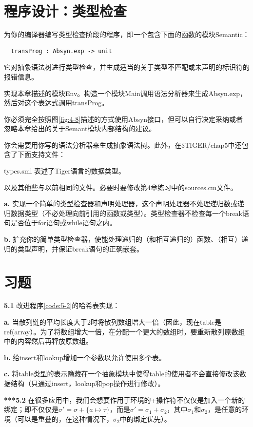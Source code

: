 \documentclass[cn,11pt,chinese]{elegantbook}
\begin{document}
\section{程序设计：类型检查}

为你的编译器编写类型检查阶段的程序，即一个包含下面的函数的模块Semantic：

\begin{lstlisting}
  transProg : Absyn.exp -> unit
\end{lstlisting}

它对抽象语法树进行类型检查，并生成适当的关于类型不匹配或未声明的标识符的报错信息。

实现本章描述的模块Env。构造一个模块Main调用语法分析器来生成Absyn.exp，然后对这个表达式调用transProg。

你必须完全按照图\ref{fig:4-8}描述的方式使用Absyn接口，但可以自行决定采纳或者忽略本章给出的关于Semant模块内部结构的建议。

你会需要用你写的语法分析器来生成抽象语法树。此外，在\$TIGER/chap5中还包含了下面支持文件：

types.sml 表述了Tiger语言的数据类型。

以及其他些与以前相同的文件。必要时要修改第4章练习中的sources.cm文件。

\textbf{a.} 实现一个简单的类型检查器和声明处理器，这个声明处理器不处理递归数或递归数据类型（不必处理向前引用的函数或类型）。类型检查器不检查每一个break语句是否位于for语句或while语句之内。

\textbf{b.} 扩充你的简单类型检查器，使能处理递归的（和相互递归的）函数、（相互）递归的类型声明，并保证break语句的正确嵌套。

\section{习题}

\textbf{5.1} 改进程序\ref{code:5-2}的哈希表实现：

\textbf{a.} 当散列链的平均长度大于2时将散列数组增大一倍（因此，现在table是ref(array）。为了将数组增大一倍，在分配一个更大的数组时，要重新散列原数组中的内容然后再释放原数组。

\textbf{b.} 给insert和lookup增加一个参数以允许使用多个表。

\textbf{c.} 将table类型的表示隐藏在一个抽象模块中使得table的使用者不会直接修改该数据结构（只通过insert，lookup和pop操作进行修改）。

\textbf{***5.2} 在很多应用中，我们会想要作用于环境的+操作符不仅仅是加入一个新的绑定；即不仅仅是$\sigma'=\sigma+\{a\mapsto\tau\}$，而是$\sigma'=\sigma_1+\sigma_2$，其中$\sigma_1$和$\sigma_2$，是任意的环境（可以是重叠的，在这种情况下，$\sigma_2$中的绑定优先）。
\end{document}
